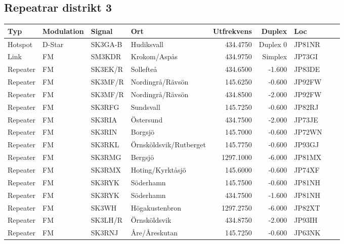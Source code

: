\subsection{Repeatrar distrikt 3}

\begin{longtable}{llllrrlcl}
	Typ      & Modulation & Signal   & Ort                    & Utfrekvens &   Duplex & Loc    &  &  \\ \hline
	Hotspot  & D-Star     & SK3GA-B  & Hudiksvall             &   434.4750 & Duplex 0 & JP81NR &  &  \\
	Link     & FM         & SM3KDR   & Krokom/Aspås           &   434.9750 &  Simplex & JP73GI &  &  \\
	Repeater & FM         & SK3EK/R  & Sollefteå              &   434.6500 &   -1.600 & JP83DE &  &  \\
	Repeater & FM         & SK3MF/R  & Nordingrå/Rävsön       &   145.6250 &   -0.600 & JP92FW &  &  \\
	Repeater & FM         & SK3MF/R  & Nordingrå/Rävsön       &   434.8500 &   -2.000 & JP92FW &  &  \\
	Repeater & FM         & SK3RFG   & Sundsvall              &   145.7250 &   -0.600 & JP82RJ &  &  \\
	Repeater & FM         & SK3RIA   & Östersund              &   434.7500 &   -2.000 & JP73JE &  &  \\
	Repeater & FM         & SK3RIN   & Borgsjö                &   145.7000 &   -0.600 & JP72WN &  &  \\
	Repeater & FM         & SK3RKL   & Örnsköldsvik/Rutberget &   145.7750 &   -0.600 & JP93GJ &  &  \\
	Repeater & FM         & SK3RMG   & Bergsjö                &  1297.1000 &   -6.000 & JP81MX &  &  \\
	Repeater & FM         & SK3RMX   & Hoting/Kyrktåsjö       &   145.6000 &   -0.600 & JP74XF &  &  \\
	Repeater & FM         & SK3RYK   & Söderhamn              &   145.7500 &   -0.600 & JP81NH &  &  \\
	Repeater & FM         & SK3RYK   & Söderhamn              &   434.7500 &   -1.600 & JP81NH &  &  \\
	Repeater & FM         & SK3WH    & Högakustenbron         &  1297.2750 &   -6.000 & JP82XT &  &  \\
	Repeater & FM         & SK3LH/R  & Örnsköldsvik           &   434.8750 &   -2.000 & JP93IH &  &  \\
	Repeater & FM         & SK3RNJ   & Åre/Åreskutan          &   145.7250 &   -0.600 & JP63NK &  &  \\

\end{longtable}

